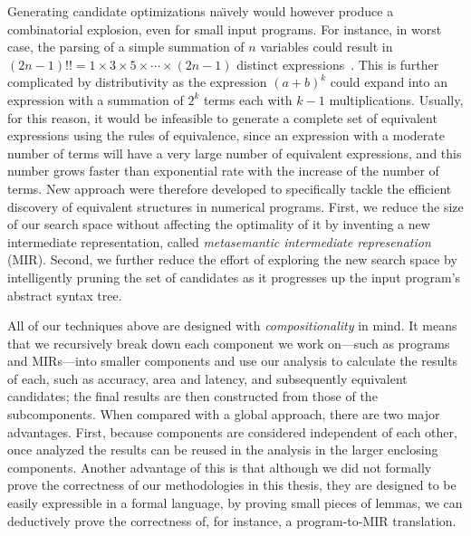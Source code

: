 Generating candidate optimizations na{\"\i}vely would however produce a
combinatorial explosion, even for small input programs.  For instance,
in worst case, the parsing of a simple summation of $n$ variables could
result in $(2n - 1)!! = 1\times3\times5\times\cdots\times(2n - 1)$ distinct
expressions~\cite{ioualalen, mouilleron}.  This is further complicated
by distributivity as the expression ${(a + b)}^k$ could expand into an
expression with a summation of $2^k$ terms each with $k - 1$ multiplications.
Usually, for this reason, it would be infeasible to generate a complete set
of equivalent expressions using the rules of equivalence, since an expression
with a moderate number of terms will have a very large number of equivalent
expressions, and this number grows faster than exponential rate with the
increase of the number of terms.  New approach were therefore developed to
specifically tackle the efficient discovery of equivalent structures in
numerical programs.
First, we reduce the size of our search space without affecting the optimality
of it by inventing a new intermediate representation, called \emph{metasemantic
intermediate represenation} (MIR).  Second, we further reduce the effort of
exploring the new search space by intelligently pruning the set of candidates
as it progresses up the input program's abstract syntax tree.

All of our techniques above are designed with \emph{compositionality} in mind.
It means that we recursively break down each component we work on---such as
programs and MIRs---into smaller components and use our analysis to calculate
the results of each, such as accuracy, area and latency, and subsequently
equivalent candidates; the final results are then constructed from those of
the subcomponents.  When compared with a global approach, there are two major
advantages.  First, because components are considered independent of each
other, once analyzed the results can be reused in the analysis in the larger
enclosing components.  Another advantage of this is that although we did not
formally prove the correctness of our methodologies in this thesis, they are
designed to be easily expressible in a formal language, by proving small
pieces of lemmas, we can deductively prove the correctness of, for instance, a
program-to-MIR translation.
